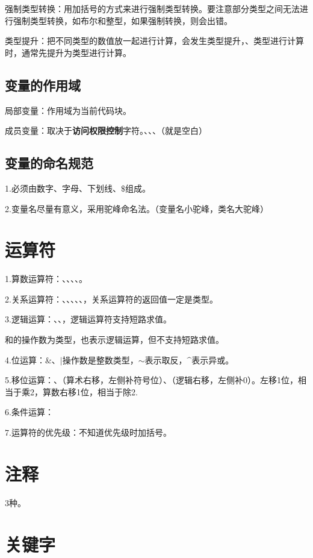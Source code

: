 \documentclass[a4paper]{report}
\begin{document}
强制类型转换：用加括号的方式来进行强制类型转换。要注意部分类型之间无法进行强制类型转换，如布尔和整型，如果强制转换，则会出错。

类型提升：把不同类型的数值放一起进行计算，会发生类型提升，、类型进行计算时，通常先提升为类型进行计算。

\subsection{变量的作用域}
局部变量：作用域为当前代码块。

成员变量：取决于\textbf{访问权限控制}字符。、、、（就是空白）
\subsection{变量的命名规范}

1.必须由数字、字母、下划线、$\$$组成。

2.变量名尽量有意义，采用驼峰命名法。（变量名小驼峰，类名大驼峰）

\section{运算符}
1.算数运算符：\dm{+}、\dm{-}、\dm{*}、\dm{/}、\dm{\%}。

2.关系运算符：\dm{<}、\dm{<=}、\dm{==}、\dm{>}、\dm{>=}、\dm{!=}，关系运算符的返回值一定是类型。

3.逻辑运算：\dm{&&}、\dm{||}、，逻辑运算符支持\textcolor[rgb]{1.00,0.00,0.00}{短路求值}。

\dm{&}和\dm{|}的操作数为类型，也表示逻辑运算，但不支持短路求值。

4.位运算：$\&$、$|$操作数是整数类型，$\sim$表示取反，$\^$表示异或。

5.移位运算：\dm{<<}、\dm{>>}（算术右移，左侧补符号位）、\dm{>>>}（逻辑右移，左侧补0）。左移1位，相当于乘2，算数右移1位，相当于除2.

6.条件运算：

7.运算符的优先级：不知道优先级时加括号。

\section{注释}
3种。
\section{关键字}
\end{document}
